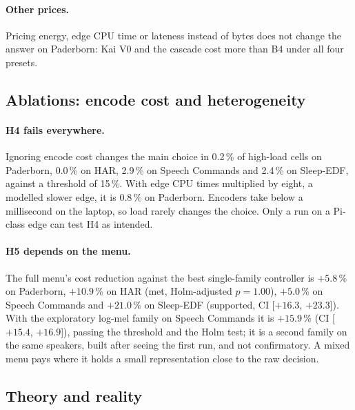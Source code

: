 \paragraph{Other prices\expl.} Pricing energy, edge CPU time or lateness instead of bytes does not
change the answer on Paderborn: Kai V0 and the cascade cost more than B4 under all four presets.

\subsection{Ablations: encode cost and heterogeneity}
\label{sec:res-ablation}

\paragraph{H4 fails everywhere.} Ignoring encode cost changes the main choice in 0.2\,\% of
high-load cells on Paderborn, 0.0\,\% on HAR, 2.9\,\% on Speech Commands and 2.4\,\% on Sleep-EDF,
against a threshold of 15\,\%. With edge CPU times multiplied by eight, a modelled slower edge, it
is 0.8\,\% on Paderborn. Encoders take below a millisecond on the laptop, so load rarely changes
the choice. Only a run on a Pi-class edge can test H4 as intended.

\paragraph{H5 depends on the menu.} The full menu's cost reduction against the best single-family
controller is $+5.8\,\%$ on Paderborn, $+10.9\,\%$ on HAR (met, Holm-adjusted $p = 1.00$),
$+5.0\,\%$ on Speech Commands and $+21.0\,\%$ on Sleep-EDF (supported, CI [$+16.3$, $+23.3$]).
With the exploratory log-mel family on Speech Commands\expl{} it is $+15.9\,\%$ (CI [$+15.4$,
$+16.9$]), passing the threshold and the Holm test; it is a second family on the same speakers,
built after seeing the first run, and not confirmatory. A mixed menu pays where it holds a small
representation close to the raw decision.

\subsection{Theory and reality}
\label{sec:res-real}

